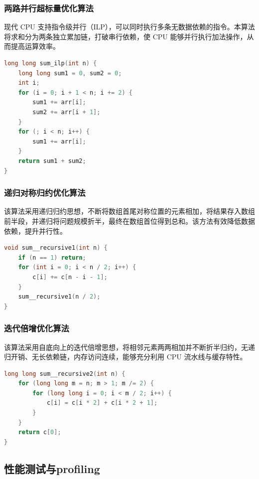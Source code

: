 \documentclass[a4paper]{article}
\begin{document}
\subsubsection{两路并行超标量优化算法}
现代 CPU 支持指令级并行（ILP），可以同时执行多条无数据依赖的指令。本算法将求和分为两条独立累加链，打破串行依赖，使 CPU 能够并行执行加法操作，从而提高运算效率。

\begin{lstlisting}[title=两路并行超标量优化算法,frame=trbl,language={C++}]
long long sum_ilp(int n) {
    long long sum1 = 0, sum2 = 0;
    int i;
    for (i = 0; i + 1 < n; i += 2) {
        sum1 += arr[i];
        sum2 += arr[i + 1];
    }
    for (; i < n; i++) {
        sum1 += arr[i];
    }
    return sum1 + sum2;
}
\end{lstlisting}

\subsubsection{递归对称归约优化算法}
该算法采用递归归约思想，不断将数组首尾对称位置的元素相加，将结果存入数组前半段，并递归将问题规模折半，最终在数组首位得到总和。该方法有效降低数据依赖，提升并行性。

\begin{lstlisting}[title=递归对称归约求和算法,frame=trbl,language={C++}]
void sum__recursive1(int n) {
    if (n == 1) return;
    for (int i = 0; i < n / 2; i++) {
        c[i] += c[n - i - 1];
    }
    sum__recursive1(n / 2);
}
\end{lstlisting}

\subsubsection{迭代倍增优化算法}
该算法采用自底向上的迭代倍增思想，将相邻元素两两相加并不断折半归约，无递归开销、无长依赖链，内存访问连续，能够充分利用 CPU 流水线与缓存特性。

\begin{lstlisting}[title=迭代倍增求和算法,frame=trbl,language={C++}]
long long sum__recursive2(int n) {
    for (long long m = n; m > 1; m /= 2) {
        for (long long i = 0; i < m / 2; i++) {
            c[i] = c[i * 2] + c[i * 2 + 1];
        }
    }
    return c[0];
}
\end{lstlisting}

\subsection{性能测试与profiling}
\end{document}
